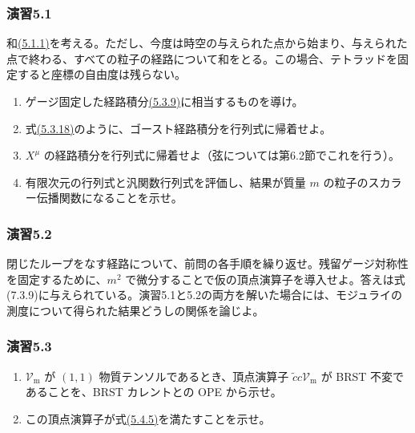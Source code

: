 
\subsubsection*{演習5.1}\label{ex:5.1}
和\hyperref[eq:5.1.1]{(5.1.1)}を考える。ただし、今度は時空の与えられた点から始まり、与えられた点で終わる、すべての粒子の経路について和をとる。この場合、テトラッドを固定すると座標の自由度は残らない。
\begin{enumerate}
\item[(a)] ゲージ固定した経路積分\hyperref[eq:5.3.9]{(5.3.9)}に相当するものを導け。
\item[(b)] 式\hyperref[eq:5.3.18]{(5.3.18)}のように、ゴースト経路積分を行列式に帰着せよ。
\item[(c)] $X^\mu$ の経路積分を行列式に帰着せよ（弦については第6.2節でこれを行う）。
\item[(d)] 有限次元の行列式と汎関数行列式を評価し、結果が質量 $m$ の粒子のスカラー伝播関数になることを示せ。
\end{enumerate}

\subsubsection*{演習5.2}\label{ex:5.2}
閉じたループをなす経路について、前問の各手順を繰り返せ。残留ゲージ対称性を固定するために、$m^2$ で微分することで仮の頂点演算子を導入せよ。答えは式(7.3.9)に与えられている。演習5.1と5.2の両方を解いた場合には、モジュライの測度について得られた結果どうしの関係を論じよ。

\subsubsection*{演習5.3}\label{ex:5.3}
\begin{enumerate}
\item[(a)] $\mathcal V_{\mathrm m}$ が $(1,1)$ 物質テンソルであるとき、頂点演算子 $\tilde c c\mathcal V_{\mathrm m}$ が BRST 不変であることを、BRST カレントとの OPE から示せ。
\item[(b)] この頂点演算子が式\hyperref[eq:5.4.5]{(5.4.5)}を満たすことを示せ。
\end{enumerate}
